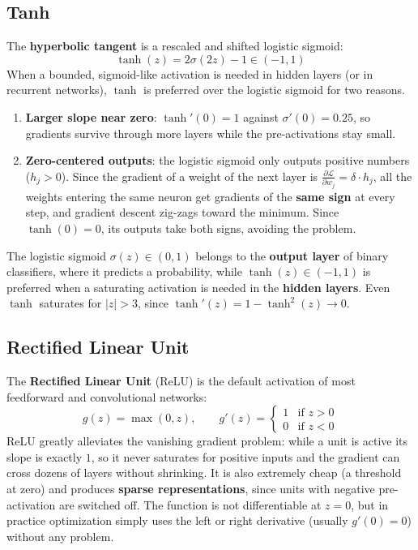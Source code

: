 \subsection{Tanh}
The \textbf{hyperbolic tangent} is a rescaled and shifted logistic sigmoid:
\begin{equation}
    \tanh(z) = 2\sigma(2z) - 1 \in (-1, 1)
\end{equation}
When a bounded, sigmoid-like activation is needed in hidden layers (or in recurrent
networks), $\tanh$ is preferred over the logistic sigmoid for two reasons.
\begin{enumerate}
    \item \textbf{Larger slope near zero}: $\tanh'(0) = 1$ against
          $\sigma'(0) = 0.25$, so gradients survive through more layers while the
          pre-activations stay small.
    \item \textbf{Zero-centered outputs}: the logistic sigmoid only outputs positive
          numbers ($h_j > 0$). Since the gradient of a weight of the next layer is
          $\frac{\partial \mathcal{L}}{\partial w_j} = \delta \cdot h_j$, all the
          weights entering the same neuron get gradients of the \textbf{same sign}
          at every step, and gradient descent zig-zags toward the minimum. Since
          $\tanh(0) = 0$, its outputs take both signs, avoiding the problem.
\end{enumerate}
\begin{note}
    The logistic sigmoid $\sigma(z) \in (0,1)$ belongs to the \textbf{output layer}
    of binary classifiers, where it predicts a probability, while $\tanh(z) \in
    (-1,1)$ is preferred when a saturating activation is needed in the
    \textbf{hidden layers}. Even $\tanh$ saturates for $|z| > 3$, since
    $\tanh'(z) = 1 - \tanh^2(z) \to 0$.
\end{note}

\subsection{Rectified Linear Unit}
The \textbf{Rectified Linear Unit} (ReLU) is the default activation of most
feedforward and convolutional networks:
\begin{equation}
    g(z) = \max(0, z), \qquad g'(z) = \begin{cases} 1 & \text{if } z > 0 \\ 0 & \text{if } z < 0 \end{cases}
\end{equation}
ReLU greatly alleviates the vanishing gradient problem: while a unit is active its
slope is exactly $1$, so it never saturates for positive inputs and the gradient
can cross dozens of layers without shrinking. It is also extremely cheap (a
threshold at zero) and produces \textbf{sparse representations}, since units with
negative pre-activation are switched off. The function is not differentiable at
$z=0$, but in practice optimization simply uses the left or right derivative
(usually $g'(0) = 0$) without any problem.

